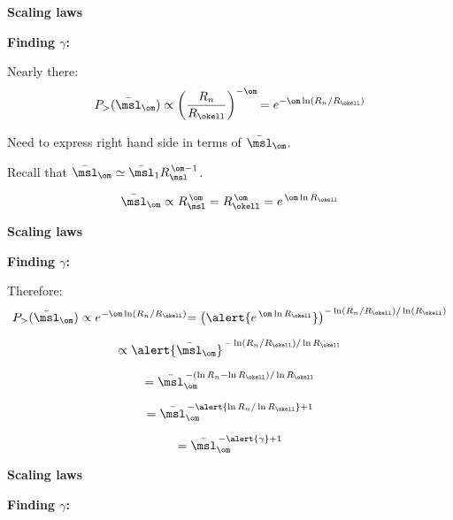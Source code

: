 \begin{frame}[label=]
\begin{frame}[label=]
\begin{frame}[label=]
\begin{frame}[label=]
\begin{frame}[label=]
\begin{frame}[label=]
\begin{frame}[label=]
\begin{frame}[label=]
\begin{frame}[label=]
\begin{frame}[label=]
\begin{frame}[label=]
\begin{frame}[label=]
\begin{frame}[label=]
\begin{frame}[label=]
\begin{frame}[label=]
\begin{frame}[label=]
\begin{frame}[label=]
\begin{frame}[label=]
\begin{frame}[label=]
\begin{frame}[label=]
\begin{frame}[label=]
\begin{frame}[label=]
\begin{frame}[label=]
\begin{frame}[label=]
\begin{frame}[label=]
\begin{frame}[label=]
\begin{frame}[label=]
\begin{frame}[label=]
\begin{frame}[label=]
\begin{frame}[label=]
  


\begin{frame}[label=]
  \textbf{Scaling laws}

  \textbf{Finding $\gamma$:}
    
     Nearly there:
      $$
      P_> (\bar{\msl}_\om)
      \propto
      \left(
        \frac{R_n}{R_\okell}
      \right)^{-\om}
      {
        =
        e^{-\om \ln (R_n/R_\okell)}
      }
      $$
     
      Need to express right hand side in terms of $\bar{\msl}_\om$.
     
      Recall that $\bar{\msl}_\om \simeq \bar{\msl}_1 R_\msl^{\, \om-1}$.
    
      $$
      \bar{\msl}_\om \propto R_\msl^{\, \om} = R_\okell^{\, \om} = e^{\, \om\ln{R_\okell}}
      $$
    
  


\begin{frame}[label=]
  \textbf{Scaling laws}

  \textbf{Finding $\gamma$:}
    
     Therefore:
      $$
      P_> (\bar{\msl}_\om)
      \propto
      e^{-\om \ln (R_n/R_\okell)}
      {
        =
        \left(
          \alert{e^{\, \om \ln R_\okell}}
        \right)^{-\ln (R_n/R_\okell)/\ln(R_\okell)}
      }
      $$
      
        $$
        \propto
        \alert{\bar{\msl}_\om}^{\, -\ln(R_n/R_\okell)/\ln R_\okell}
        $$
      
        $$
        =
        \bar{\msl}_\om^{\, -(\ln R_n - \ln R_\okell)/\ln R_\okell}
        $$
      
        $$
        =
        \bar{\msl}_\om^{\, - \alert{\ln R_n/\ln R_\okell} + 1}
        $$
      
        $$
        =
        \bar{\msl}_\om^{\, -\alert{\gamma} + 1}
        $$
    
  


\begin{frame}[label=]
  \textbf{Scaling laws}

  \textbf{Finding $\gamma$:}
    

\end{frame}
\end{frame}
\end{frame}
\end{frame}
\end{frame}
\end{frame}
\end{frame}
\end{frame}
\end{frame}
\end{frame}
\end{frame}
\end{frame}
\end{frame}
\end{frame}
\end{frame}
\end{frame}
\end{frame}
\end{frame}
\end{frame}
\end{frame}
\end{frame}
\end{frame}
\end{frame}
\end{frame}
\end{frame}
\end{frame}
\end{frame}
\end{frame}
\end{frame}
\end{frame}
\end{frame}
\end{frame}
\end{frame}

